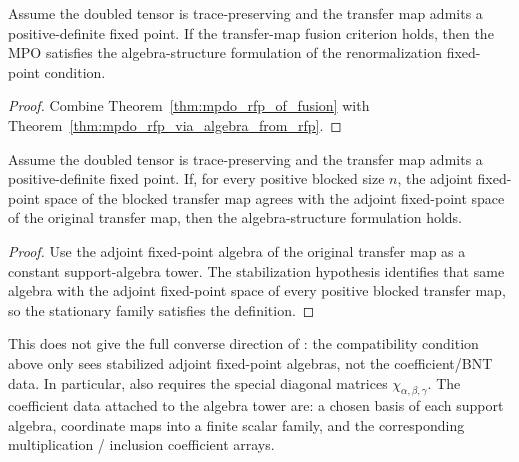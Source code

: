 \begin{theorem}%
    \label{thm:mpdo_rfp_via_algebra_from_fusion}
    \leanok
    Assume the doubled tensor is trace-preserving and the transfer map admits a
    positive-definite fixed point. If the transfer-map fusion criterion holds,
    then the MPO satisfies the algebra-structure formulation of the
    renormalization fixed-point condition.
\end{theorem}
\begin{proof}\leanok
    Combine Theorem~\ref{thm:mpdo_rfp_of_fusion} with
    Theorem~\ref{thm:mpdo_rfp_via_algebra_from_rfp}.
\end{proof}

\begin{theorem}%
    \label{thm:mpdo_algebra_from_stabilized_adjoint_fixedpoints}
    \leanok
    Assume the doubled tensor is trace-preserving and the transfer map admits a
    positive-definite fixed point. If, for every positive blocked size $n$, the
    adjoint fixed-point space of the blocked transfer map agrees with the
    adjoint fixed-point space of the original transfer map, then the
    algebra-structure formulation holds.
\end{theorem}
\begin{proof}\leanok
    Use the adjoint fixed-point algebra of the original transfer map as a constant
    support-algebra tower. The stabilization hypothesis identifies that same
    algebra with the adjoint fixed-point space of every positive blocked transfer
    map, so the stationary family satisfies the definition.
\end{proof}

This does not give the full converse direction of
\cite[Theorem~4.14]{Cirac2016MPDO_arXiv}: the compatibility condition above
only sees stabilized adjoint fixed-point algebras, not the coefficient/BNT data.
In particular, \cite[Theorem~4.14(ii)]{Cirac2016MPDO_arXiv} also requires the special diagonal matrices
$\chi_{\alpha,\beta,\gamma}$. The coefficient data attached to the algebra tower are:
a chosen basis of each support algebra, coordinate maps into a finite scalar
family, and the corresponding multiplication / inclusion coefficient arrays.

